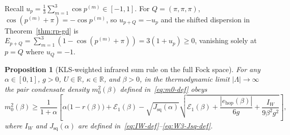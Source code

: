 \documentclass[11pt]{article}
\newtheorem{proposition}[theorem]{Proposition}
\theoremstyle{definition}
\theoremstyle{remark}
\newcommand{\calE}{\mathcal{E}}
\newcommand{\bbR}{\mathbb{R}}
\begin{document}
Recall $u_p = \frac{1}{3}\sum_{m=1}^3 \cos p^{(m)} \in [-1, 1]$. For $Q = (\pi,\pi,\pi)$, $\cos(p^{(m)} + \pi) = -\cos p^{(m)}$, so $u_{p+Q} = -u_p$ and the shifted dispersion in Theorem~\ref{thm:rp-gd} is $E_{p+Q} = \sum_{m=1}^3(1 - \cos(p^{(m)} + \pi)) = 3(1 + u_p) \ge 0$, vanishing solely at $p = Q$ where $u_Q = -1$.

\begin{proposition}[KLS-weighted infrared sum rule on the full Fock space]\label{prop:kls}
For any $\alpha \in [0, 1]$, $g > 0$, $U \in \bbR$, $\kappa \in \bbR$, and $\beta > 0$, in the thermodynamic limit $|\Lambda| \to \infty$ the pair condensate density $m_0^2(\beta)$ defined in~\eqref{eq:m0-def} obeys
\begin{equation}\label{eq:kls-sumrule}
m_0^2(\beta) \ge \frac{1}{1 + \alpha}\left[\alpha\bigl(1 - r(\beta)\bigr) + \calE_1(\beta) - \sqrt{J_{\mathrm{sq}}(\alpha)}\sqrt{\calE_1(\beta) + \frac{|e_{\mathrm{hop}}(\beta)|}{6g} + \frac{I_W}{9\beta^2 g^2}}\right],
\end{equation}
where $I_W$ and $J_{\mathrm{sq}}(\alpha)$ are defined in~\eqref{eq:IW-def}--\eqref{eq:W3-Jsq-def}.
\end{proposition}
\end{document}
